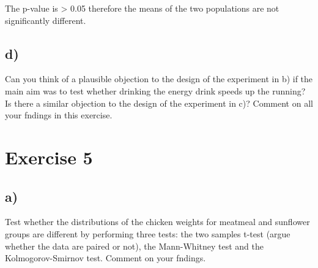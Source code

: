 \documentclass[
]{article}
\newenvironment{Shaded}{\begin{snugshade}}{\end{snugshade}}
\newcommand{\CommentTok}[1]{\textcolor[rgb]{0.56,0.35,0.01}{\textit{#1}}}
\newcommand{\FunctionTok}[1]{\textcolor[rgb]{0.00,0.00,0.00}{#1}}
\newcommand{\NormalTok}[1]{#1}
\newcommand{\OtherTok}[1]{\textcolor[rgb]{0.56,0.35,0.01}{#1}}
\newcommand{\SpecialCharTok}[1]{\textcolor[rgb]{0.00,0.00,0.00}{#1}}
\newcommand{\StringTok}[1]{\textcolor[rgb]{0.31,0.60,0.02}{#1}}
\begin{document}
The p-value is \textgreater{} 0.05 therefore the means of the two
populations are not significantly different.

\hypertarget{d-2}{%
\subsection{d)}\label{d-2}}

Can you think of a plausible objection to the design of the experiment
in b) if the main aim was to test whether drinking the energy drink
speeds up the running? Is there a similar objection to the design of the
experiment in c)? Comment on all your fndings in this exercise.

\hypertarget{exercise-5}{%
\section{Exercise 5}\label{exercise-5}}

\hypertarget{a-3}{%
\subsection{a)}\label{a-3}}

Test whether the distributions of the chicken weights for meatmeal and
sunflower groups are different by performing three tests: the two
samples t-test (argue whether the data are paired or not), the
Mann-Whitney test and the Kolmogorov-Smirnov test. Comment on your
fndings.

\begin{Shaded}
\end{Shaded}
\end{document}
